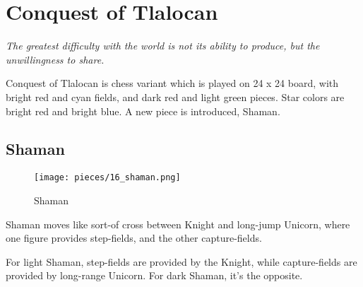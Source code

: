 

\chapter*{Conquest of Tlalocan}
\label{ch:Conquest of Tlalocan}

\begin{flushright}
\parbox{0.78\textwidth}{
\emph{The greatest difficulty with the world is not its ability to produce, but the unwillingness to share. \newline
{} } }
\end{flushright}

\noindent
Conquest of Tlalocan is chess variant which is played on 24 x 24 board,
with bright red and cyan fields, and dark red and light green pieces.
Star colors are bright red and bright blue.
A new piece is introduced, Shaman.

\clearpage %

\section*{Shaman}
\label{sec:Conquest of Tlalocan/Shaman}

\vspace*{-0.7\baselineskip}
\noindent
\begin{wrapfigure}[10]{l}{0.4\textwidth}
\centering
\texttt{[image: pieces/16\_shaman.png]}
\vspace*{-1.4\baselineskip}
\caption{Shaman}
\label{fig:16_shaman}
\end{wrapfigure}
Shaman moves like sort-of cross between Knight and long-jump Unicorn,
where one figure provides step-fields, and the other capture-fields.

For light Shaman, step-fields are provided by the Knight, while capture-fields
are provided by long-range Unicorn. For dark Shaman, it's the opposite.

